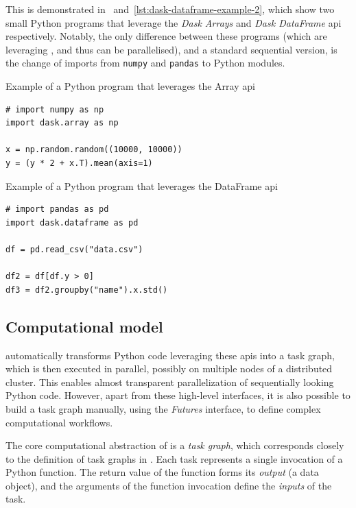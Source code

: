 This is demonstrated in~ and~\ref{lst:dask-dataframe-example-2}, which show two
small Python programs that leverage the \emph{Dask Arrays} and \emph{Dask DataFrame}
\gls{api} respectively. Notably, the only difference between these programs
(which are leveraging \dask{}, and thus can be parallelised), and a standard
sequential version, is the change of imports from \texttt{numpy} and
\texttt{pandas} to \dask{} Python modules.

\begin{listing}[h]
	\caption{Example of a Python program that leverages the \dask{} Array
	\gls{api}}
	\label{lst:dask-array-example}
	\begin{verbatim}
# import numpy as np
import dask.array as np

x = np.random.random((10000, 10000))
y = (y * 2 + x.T).mean(axis=1)
	\end{verbatim}
\end{listing}

\begin{listing}[h]
	\caption{Example of a Python program that leverages the \dask{} DataFrame
	\gls{api}}
	\label{lst:dask-dataframe-example-2}
	\begin{verbatim}
# import pandas as pd
import dask.dataframe as pd

df = pd.read_csv("data.csv")

df2 = df[df.y > 0]
df3 = df2.groupby("name").x.std()
	\end{verbatim}
\end{listing}

\subsection*{Computational model}
\dask{} automatically transforms Python code leveraging these
\glspl{api} into a task graph, which is then executed in parallel, possibly on
multiple nodes of a distributed cluster. This enables almost transparent parallelization of
sequentially looking Python code. However, apart from these high-level interfaces, it is also
possible to build a task graph manually, using the \emph{Futures} interface, to define
complex computational workflows.

The core computational abstraction of \dask{} is a \emph{task graph},
which corresponds closely to the definition of task graphs in . Each
task represents a single invocation of a Python function. The return value of the function forms
its \emph{output} (a data object), and the arguments of the function invocation define the
\emph{inputs} of the task.

